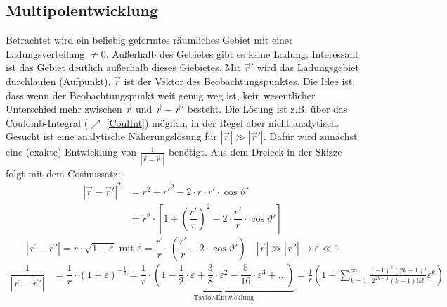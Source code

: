  \subsection{Multipolentwicklung}
	  
	  Betrachtet wird ein beliebig geformtes räumliches Gebiet mit einer Ladungsverteilung $\neq 0$. Außerhalb des Gebietes gibt es keine Ladung. Interessant ist das Gebiet deutlich außerhalb dieses Giebietes. Mit $\vec{r}'$ wird das Ladungsgebiet durchlaufen (Aufpunkt). $\vec{r}$ ist der Vektor des Beobachtungspunktes. Die Idee ist, dass wenn der Beobachtungspunkt weit genug weg ist, kein wesentlicher Unterschied mehr zwischen $\vec{r}$ und $\vec{r}-\vec{r}'$ besteht. Die Lösung ist z.B. über das Coulomb-Integral ($\nearrow$ \ref{CoulInt}) möglich, in der Regel aber nicht analytisch. Gesucht ist eine analytische Näherungslösung für \(\left| \vec{r}  \right| \gg \left| \vec{r}'  \right| \). Dafür wird zunächst eine (exakte) Entwicklung von $\frac{1}{|\vec{r} -\vec{r}' |}$ benötigt. Aus dem Dreieck in der Skizze folgt mit dem Cosinussatz:
		        \begin{equation*}\begin{split}
				        \left| \vec{r}  - \vec{r}'  \right|^2
				        &= r^2 +  r'^2 - 2 \cdot r \cdot  r' \cdot \cos \vartheta' \\
				        &= r^2 \cdot \left[ 1 + \left(\dfrac{ r'}{r} \right)^2 - 2 \cdot \dfrac{ r'}{r} \cdot
					        \cos \vartheta' \right]
			        \end{split}\end{equation*}
		        \begin{equation*}
			        \left| \vec{r}  - \vec{r}'  \right| = r \cdot \sqrt{1 + \varepsilon} \text{ mit } \varepsilon = \dfrac{ r'}{r} \cdot \left( \dfrac{ r'}{r} - 2 \cdot \cos \vartheta' \right) \quad \left| \vec{r}  \right| \gg \left| \vec{r}'  \right| \to \varepsilon \ll 1
		        \end{equation*}
	  \begin{equation*}\begin{split}
			  \dfrac{1}{\left| \vec{r}  - \vec{r}'  \right|}
			  &= \dfrac{1}{r} \cdot \left( 1 + \varepsilon \right)^{-\frac{1}{2}} = \dfrac{1}{r} \cdot \underbrace{\left( 1 - \dfrac{1}{2} \cdot \varepsilon + \dfrac{3}{8} \cdot \varepsilon^2 - \dfrac{5}{16} \cdot \varepsilon^3 + \dots \right)}_\text{Taylor-Entwicklung}=\frac{1}{r}\left( 1 + \sum_{k=1}^\infty \frac{(-1)^k(2k-1)!}{2^{2k-1}(k-1)!k!} \varepsilon^k\right)
		  \end{split}\end{equation*}
